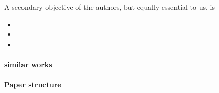 A secondary objective of the authors, but equally essential to us, is
\begin{itemize}
  \item {}
  \item {}
  \item {}
\end{itemize}


\paragraph{similar works}
\label{sec:intro:similar_works}

\paragraph{Paper structure}
\label{sec:intro:paper_structure}



